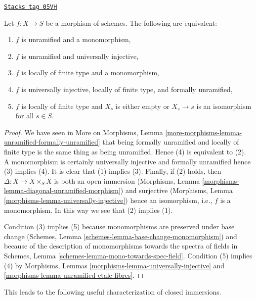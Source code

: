 \begin{lemma}
\label{etale-lemma-universally-injective-unramified}
\href{https://stacks.math.columbia.edu/tag/05VH}{\texttt{Stacks tag 05VH}}

Let $f : X \to S$ be a morphism of schemes.
The following are equivalent:
\begin{enumerate}
\item $f$ is unramified and a monomorphism,
\item $f$ is unramified and universally injective,
\item $f$ is locally of finite type and a monomorphism,
\item $f$ is universally injective, locally of finite type, and
formally unramified,
\item $f$ is locally of finite type and $X_s$ is either empty
or $X_s \to s$ is an isomorphism for all $s \in S$.
\end{enumerate}
\end{lemma}

\begin{proof}
We have seen in
More on Morphisms, Lemma
\ref{more-morphisms-lemma-unramified-formally-unramified}
that being formally unramified and locally of finite type is the same thing
as being unramified. Hence (4) is equivalent to (2).
A monomorphism is certainly universally injective and
formally unramified hence (3) implies (4).
It is clear that (1) implies (3). Finally, if (2) holds, then
$\Delta : X \to X \times_S X$ is both an open immersion
(Morphisms, Lemma \ref{morphisms-lemma-diagonal-unramified-morphism})
and surjective
(Morphisms, Lemma \ref{morphisms-lemma-universally-injective})
hence an isomorphism, i.e., $f$ is a monomorphism. In this way we see that
(2) implies (1).

\medskip\noindent
Condition (3) implies (5) because monomorphisms are preserved under
base change
(Schemes, Lemma \ref{schemes-lemma-base-change-monomorphism})
and because of the description of monomorphisms towards the spectra of fields
in
Schemes, Lemma \ref{schemes-lemma-mono-towards-spec-field}.
Condition (5) implies (4) by
Morphisms, Lemmas \ref{morphisms-lemma-universally-injective} and
\ref{morphisms-lemma-unramified-etale-fibres}.
\end{proof}

This leads to the following useful characterization of closed immersions.

